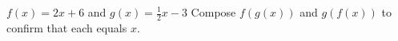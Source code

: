 {$f(x) = 2x+6$ and $g(x) = \frac12x-3$}
{Compose $f(g(x))$ and $g(f(x))$ to confirm that each equals $x$.
}
